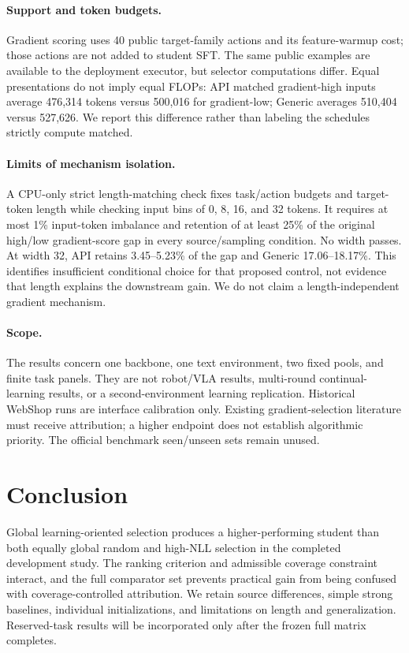 \documentclass{article}
\begin{document}
\paragraph{Support and token budgets.} Gradient scoring uses 40 public target-family actions and its feature-warmup cost; those actions are not added to student SFT. The same public examples are available to the deployment executor, but selector computations differ. Equal presentations do not imply equal FLOPs: API matched gradient-high inputs average 476,314 tokens versus 500,016 for gradient-low; Generic averages 510,404 versus 527,626. We report this difference rather than labeling the schedules strictly compute matched.

\paragraph{Limits of mechanism isolation.} A CPU-only strict length-matching check fixes task/action budgets and target-token length while checking input bins of 0, 8, 16, and 32 tokens. It requires at most 1\% input-token imbalance and retention of at least 25\% of the original high/low gradient-score gap in every source/sampling condition. No width passes. At width 32, API retains 3.45--5.23\% of the gap and Generic 17.06--18.17\%. This identifies insufficient conditional choice for that proposed control, not evidence that length explains the downstream gain. We do not claim a length-independent gradient mechanism.

\paragraph{Scope.} The results concern one backbone, one text environment, two fixed pools, and finite task panels. They are not robot/VLA results, multi-round continual-learning results, or a second-environment learning replication. Historical WebShop runs are interface calibration only. Existing gradient-selection literature must receive attribution; a higher endpoint does not establish algorithmic priority. The official benchmark seen/unseen sets remain unused.

\section{Conclusion}
Global learning-oriented selection produces a higher-performing student than both equally global random and high-NLL selection in the completed development study. The ranking criterion and admissible coverage constraint interact, and the full comparator set prevents practical gain from being confused with coverage-controlled attribution. We retain source differences, simple strong baselines, individual initializations, and limitations on length and generalization. Reserved-task results will be incorporated only after the frozen full matrix completes.
\end{document}

